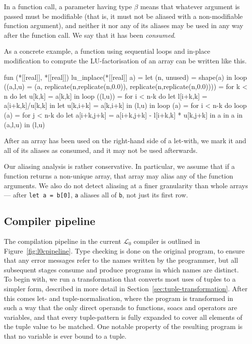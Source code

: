 \documentclass{sigplanconf}  %
\newcommand{\LO}{$\mathcal{L}_0$}
\begin{document}
In a function call, a parameter having type {\tt *$\beta$} means that
whatever argument is passed must be modifiable (that is, it must not
be aliased with a non-modifiable function argument), and neither it
nor any of its aliases may be used in any way after the function call.
We say that it has been {\em consumed}.

As a concrete example, a function using sequential loops and in-place
modification to compute the LU-factorisation of an array can be
written like this.

\begin{colorcode}
fun (*[[real]], *[[real]]) lu_inplace(*[[real]] a) =
  let (n, unused) = shape(a) in
  loop ((a,l,u) = (a,
                   replicate(n,replicate(n,0.0)),
                   replicate(n,replicate(n,0.0)))) =
    for k < n do
      let u[k,k] = a[k,k] in
      loop ((l,u)) = for i < n-k do
          let l[i+k,k] = a[i+k,k]/u[k,k] in
          let u[k,i+k] = a[k,i+k] in
          (l,u)
        in
      loop (a) = for i < n-k do
        loop (a) = for j < n-k do
          let a[i+k,j+k] =
            a[i+k,j+k] - l[i+k,k] * u[k,j+k] in
          a
        in a
      in (a,l,u)
    in
  (l,u)
\end{colorcode}

After an array has been used on the right-hand side of a let-with, we
mark it and all of its aliases as consumed, and it may not be used
afterwards.

Our aliasing analysis is rather conservative.  In particular, we
assume that if a function returns a non-unique array, that array may
alias any of the function arguments.  We also do not detect aliasing
at a finer granularity than whole arrays --- after {\tt let a = b[0]},
{\tt a} aliases all of {\tt b}, not just its first row.

\subsection{Compiler pipeline}
\label{sec:compiler-pipeline}

The compilation pipeline in the current \LO{} compiler is outlined in
Figure~\ref{fig:l0cpipeline}.  Type checking is done on the original
program, to ensure that any error messages refer to the names written
by the programmer, but all subsequent stages consume and produce
programs in which names are distinct.  To begin with, we run a
transformation that converts most uses of tuples to a simpler form,
described in more detail in Section~\ref{sec:tuple-transformation}.
After this comes let- and tuple-normalisation, where the program is
transformed in such a way that the only direct operands to functions,
{\sc soac}s and operators are variables, and that every tuple-pattern
is fully expanded to cover all elements of the tuple value to be
matched.  One notable property of the resulting program is that no
variable is ever bound to a tuple.
\end{document}
